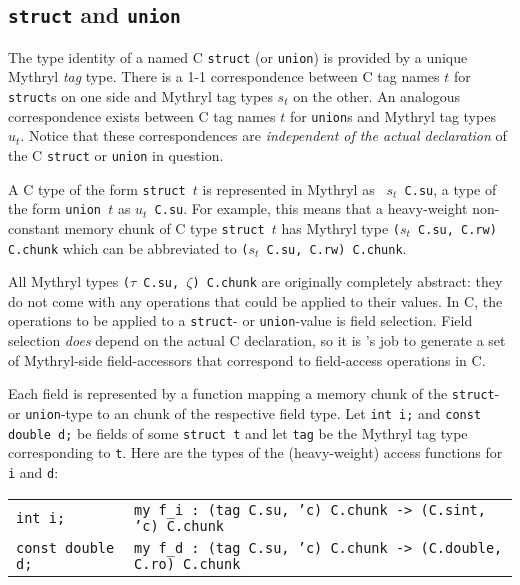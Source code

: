 \subsection{{\tt struct} and {\tt union}}
 
The type identity of a named C {\tt struct} (or {\tt union}) is
provided by a unique Mythryl {\em tag} type.  There is a 1-1 correspondence
between C tag names $t$ for {\tt struct}s on one side and Mythryl tag types
$s_t$ on the other.  An analogous correspondence exists between C tag
names $t$ for {\tt union}s and Mythryl tag types $u_t$.  Notice that these
correspondences are {\em independent of the actual declaration} of the
C {\tt struct} or {\tt union} in question.

A C type of the form {\tt struct $t$} is represented in Mythryl as {\tt
  $s_t$ C.su}, a type of the form {\tt union $t$} as {\tt $u_t$ C.su}.
For example, this means that a heavy-weight non-constant memory chunk
of C type {\tt struct $t$} has Mythryl type {\tt ($s_t$ C.su, C.rw) C.chunk}
which can be abbreviated to {\tt ($s_t$ C.su, C.rw) C.chunk}.

All Mythryl types {\tt ($\tau$ C.su, $\zeta$) C.chunk} are originally
completely abstract: they do not come with any operations that could
be applied to their values.  In C, the operations to be applied to a
{\tt struct}- or {\tt union}-value is field selection.  Field
selection {\em does} depend on the actual C declaration, so it is
{\cgluemaker}'s job to generate a set of Mythryl-side field-accessors that
correspond to field-access operations in C.

Each field is represented by a function mapping a memory chunk of the
{\tt struct}- or {\tt union}-type to an chunk of the respective field
type.  Let {\tt int i;} and {\tt const double d;} be fields of some
{\tt struct t} and let {\tt tag} be the Mythryl tag type corresponding to
{\tt t}.  Here are the types of the (heavy-weight) access functions
for {\tt i} and {\tt d}:

\begin{small}
\begin{center}
\begin{tabular}{l@{~~~~$\leadsto$~~~~}l}
{\tt int i;} &
  {\tt my f\_i : (tag C.su, 'c) C.chunk -> (C.sint, 'c) C.chunk} \\
{\tt const double d;} &
  {\tt my f\_d : (tag C.su, 'c) C.chunk -> (C.double, C.ro) C.chunk}
\end{tabular}
\end{center}
\end{small}

